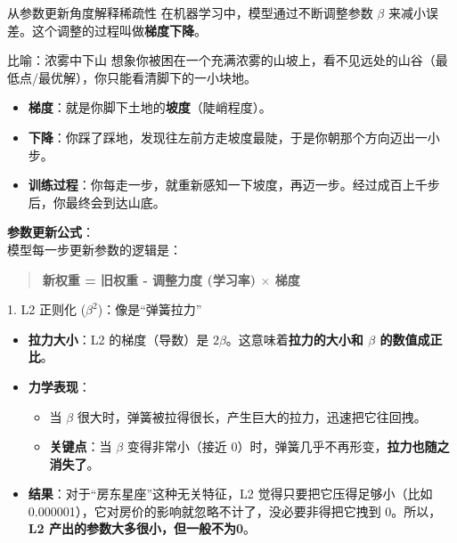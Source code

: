 \documentclass[aspectratio=169]{beamer}
\begin{document}
\begin{frame}{从参数更新角度解释稀疏性}
    在机器学习中，模型通过不断调整参数 $\beta$ 来减小误差。这个调整的过程叫做\textbf{梯度下降}。
    
    \begin{block}{比喻：浓雾中下山}
        想象你被困在一个充满浓雾的山坡上，看不见远处的山谷（最低点/最优解），你只能看清脚下的一小块地。
        \begin{itemize}
            \item \textbf{梯度}：就是你脚下土地的\textbf{坡度}（陡峭程度）。
            \item \textbf{下降}：你踩了踩地，发现往左前方走坡度最陡，于是你朝那个方向迈出一小步。
            \item \textbf{训练过程}：你每走一步，就重新感知一下坡度，再迈一步。经过成百上千步后，你最终会到达山底。
        \end{itemize}
    \end{block}

    \textbf{参数更新公式}：\\
    模型每一步更新参数的逻辑是：
    \begin{quote}
        \textbf{新权重 = 旧权重 - 调整力度 (学习率) $\times$ 梯度}
    \end{quote}
\end{frame}

\begin{frame}{1. L2 正则化 ($\beta^2$)：像是“弹簧拉力”}
    \begin{itemize}
        \item \textbf{拉力大小}：L2 的梯度（导数）是 $2\beta$。这意味着\textbf{拉力的大小和 $\beta$ 的数值成正比}。
        \item \textbf{力学表现}：
        \begin{itemize}
            \item 当 $\beta$ 很大时，弹簧被拉得很长，产生巨大的拉力，迅速把它往回拽。
            \item \textbf{关键点}：当 $\beta$ 变得非常小（接近 0）时，弹簧几乎不再形变，\textbf{拉力也随之消失了}。
        \end{itemize}
        \item \textbf{结果}：对于“房东星座”这种无关特征，L2 觉得只要把它压得足够小（比如 0.000001），它对房价的影响就忽略不计了，没必要非得把它拽到 0。所以，\textbf{L2 产出的参数大多很小，但一般不为0}。
    \end{itemize}
\end{frame}
\end{document}
